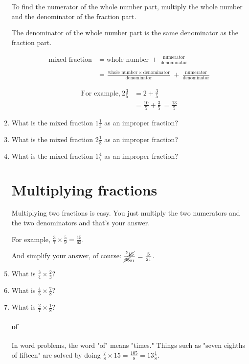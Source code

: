 \documentclass[14pt]{article}
\begin{document}
\begin{enumerate}
To find the numerator of the whole number part, multiply the whole number and the denominator of the fraction part.

The denominator of the whole number part is the same denominator as the fraction part.

\begin{align*}
\textrm{mixed fraction} &= \textrm{whole number}\ +\ \frac{\textrm{numerator}}{\textrm{denominator}}\\\\
&= \frac{\textrm{whole number}\ \times\ \textrm{denominator}}{\textrm{denominator}}\
+\ \frac{\textrm{numerator}}{\textrm{denominator}}
\end{align*}

\begin{align*}
\textrm{For example,}\ 2 \frac{3}{5} &= 2 + \frac{3}{5}\\
&= \frac{10}{5} + \frac{3}{5}\ = \frac{13}{5}
\end{align*}

\item What is the mixed fraction $1 \frac{1}{3}$ as an improper fraction?
\item What is the mixed fraction $2 \frac{1}{8}$ as an improper fraction?
\item What is the mixed fraction $1 \frac{4}{7}$ as an improper fraction?

\section{Multiplying fractions}
Multiplying two fractions is easy. You just multiply the two numerators and the two denominators and that’s your answer.

For example, $\frac{3}{7} \times \frac{5}{9} = \frac{15}{63}$.

And simplify your answer, of course: $\frac{^5\cancel{15}}{\cancel{63}_{21}} = \frac{5}{21}$.\\

\item What is $\frac{3}{4} \times \frac{2}{3}$?
\item What is $\frac{4}{5} \times \frac{7}{8}$?
\item What is $\frac{2}{7} \times \frac{1}{8}$?

\paragraph{of}
In word problems, the word "of" means "times." Things such as "seven eighths of fifteen" are solved by doing $\frac{7}{8}\times15=\frac{105}{8}=13\frac{1}{8}$.\\


\end{enumerate}
\end{document}
